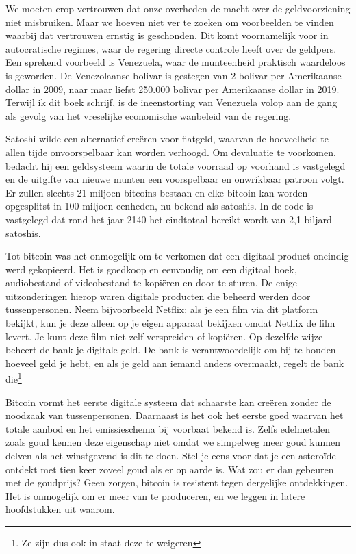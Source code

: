 We moeten erop vertrouwen dat onze overheden de macht over de geldvoorziening niet misbruiken. Maar we hoeven niet ver te zoeken om voorbeelden te vinden waarbij dat vertrouwen ernstig is geschonden. Dit komt voornamelijk voor in autocratische regimes, waar de regering directe controle heeft over de geldpers. Een sprekend voorbeeld is Venezuela, waar de munteenheid praktisch waardeloos is geworden. De Venezolaanse bolivar is gestegen van 2 bolivar per Amerikaanse dollar in 2009, naar maar liefst 250.000 bolivar per Amerikaanse dollar in 2019. Terwijl ik dit boek schrijf, is de ineenstorting van Venezuela volop aan de gang als gevolg van het vreselijke economische wanbeleid van de regering.

Satoshi wilde een alternatief creëren voor fiatgeld, waarvan de hoeveelheid te allen tijde onvoorspelbaar kan worden verhoogd. Om devaluatie te voorkomen, bedacht hij een geldsysteem waarin de totale voorraad op voorhand is vastgelegd en de uitgifte van nieuwe munten een voorspelbaar en onwrikbaar patroon volgt. Er zullen slechts 21 miljoen bitcoins bestaan en elke bitcoin kan worden opgesplitst in 100 miljoen eenheden, nu bekend als satoshis. In de code is vastgelegd dat rond het jaar 2140 het eindtotaal bereikt wordt van 2,1 biljard satoshis.

Tot bitcoin was het onmogelijk om te verkomen dat een digitaal product oneindig werd gekopieerd. Het is goedkoop en eenvoudig om een digitaal boek, audiobestand of videobestand te kopiëren en door te sturen. De enige uitzonderingen hierop waren digitale producten die beheerd werden door tussenpersonen. Neem bijvoorbeeld Netflix: als je een film via dit platform bekijkt, kun je deze alleen op je eigen apparaat bekijken omdat Netflix de film levert. Je kunt deze film niet zelf verspreiden of kopiëren. Op dezelfde wijze beheert de bank je digitale geld. De bank is verantwoordelijk om bij te houden hoeveel geld je hebt, en als je geld aan iemand anders overmaakt, regelt de bank die\footnote{Ze zijn dus ook in staat deze te weigeren}

Bitcoin vormt het eerste digitale systeem dat schaarste kan creëren zonder de noodzaak van tussenpersonen. Daarnaast is het ook het eerste goed waarvan het totale aanbod en het emissieschema bij voorbaat bekend is. Zelfs edelmetalen zoals goud kennen deze eigenschap niet omdat we simpelweg meer goud kunnen delven als het winstgevend is dit te doen. Stel je eens voor dat je een asteroïde ontdekt met tien keer zoveel goud als er op aarde is. Wat zou er dan gebeuren met de goudprijs? Geen zorgen, bitcoin is resistent tegen dergelijke ontdekkingen. Het is onmogelijk om er meer van te produceren, en we leggen in latere hoofdstukken uit waarom.
 
